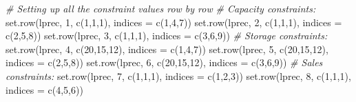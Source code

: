 \documentclass[
]{article}
\newenvironment{Shaded}{\begin{snugshade}}{\end{snugshade}}
\newcommand{\AttributeTok}[1]{\textcolor[rgb]{0.77,0.63,0.00}{#1}}
\newcommand{\CommentTok}[1]{\textcolor[rgb]{0.56,0.35,0.01}{\textit{#1}}}
\newcommand{\DecValTok}[1]{\textcolor[rgb]{0.00,0.00,0.81}{#1}}
\newcommand{\FunctionTok}[1]{\textcolor[rgb]{0.00,0.00,0.00}{#1}}
\newcommand{\NormalTok}[1]{#1}
\begin{document}
\begin{Shaded}
\begin{Highlighting}[]
\CommentTok{\# Setting up all the constraint values row by row}
\CommentTok{\# Capacity constraints:}
\FunctionTok{set.row}\NormalTok{(lprec, }\DecValTok{1}\NormalTok{, }\FunctionTok{c}\NormalTok{(}\DecValTok{1}\NormalTok{,}\DecValTok{1}\NormalTok{,}\DecValTok{1}\NormalTok{), }\AttributeTok{indices =} \FunctionTok{c}\NormalTok{(}\DecValTok{1}\NormalTok{,}\DecValTok{4}\NormalTok{,}\DecValTok{7}\NormalTok{))}
\FunctionTok{set.row}\NormalTok{(lprec, }\DecValTok{2}\NormalTok{, }\FunctionTok{c}\NormalTok{(}\DecValTok{1}\NormalTok{,}\DecValTok{1}\NormalTok{,}\DecValTok{1}\NormalTok{), }\AttributeTok{indices =} \FunctionTok{c}\NormalTok{(}\DecValTok{2}\NormalTok{,}\DecValTok{5}\NormalTok{,}\DecValTok{8}\NormalTok{))}
\FunctionTok{set.row}\NormalTok{(lprec, }\DecValTok{3}\NormalTok{, }\FunctionTok{c}\NormalTok{(}\DecValTok{1}\NormalTok{,}\DecValTok{1}\NormalTok{,}\DecValTok{1}\NormalTok{), }\AttributeTok{indices =} \FunctionTok{c}\NormalTok{(}\DecValTok{3}\NormalTok{,}\DecValTok{6}\NormalTok{,}\DecValTok{9}\NormalTok{))}
\CommentTok{\# Storage constraints:}
\FunctionTok{set.row}\NormalTok{(lprec, }\DecValTok{4}\NormalTok{, }\FunctionTok{c}\NormalTok{(}\DecValTok{20}\NormalTok{,}\DecValTok{15}\NormalTok{,}\DecValTok{12}\NormalTok{), }\AttributeTok{indices =} \FunctionTok{c}\NormalTok{(}\DecValTok{1}\NormalTok{,}\DecValTok{4}\NormalTok{,}\DecValTok{7}\NormalTok{))}
\FunctionTok{set.row}\NormalTok{(lprec, }\DecValTok{5}\NormalTok{, }\FunctionTok{c}\NormalTok{(}\DecValTok{20}\NormalTok{,}\DecValTok{15}\NormalTok{,}\DecValTok{12}\NormalTok{), }\AttributeTok{indices =} \FunctionTok{c}\NormalTok{(}\DecValTok{2}\NormalTok{,}\DecValTok{5}\NormalTok{,}\DecValTok{8}\NormalTok{))}
\FunctionTok{set.row}\NormalTok{(lprec, }\DecValTok{6}\NormalTok{, }\FunctionTok{c}\NormalTok{(}\DecValTok{20}\NormalTok{,}\DecValTok{15}\NormalTok{,}\DecValTok{12}\NormalTok{), }\AttributeTok{indices =} \FunctionTok{c}\NormalTok{(}\DecValTok{3}\NormalTok{,}\DecValTok{6}\NormalTok{,}\DecValTok{9}\NormalTok{))}
\CommentTok{\# Sales constraints:}
\FunctionTok{set.row}\NormalTok{(lprec, }\DecValTok{7}\NormalTok{, }\FunctionTok{c}\NormalTok{(}\DecValTok{1}\NormalTok{,}\DecValTok{1}\NormalTok{,}\DecValTok{1}\NormalTok{), }\AttributeTok{indices =} \FunctionTok{c}\NormalTok{(}\DecValTok{1}\NormalTok{,}\DecValTok{2}\NormalTok{,}\DecValTok{3}\NormalTok{))}
\FunctionTok{set.row}\NormalTok{(lprec, }\DecValTok{8}\NormalTok{, }\FunctionTok{c}\NormalTok{(}\DecValTok{1}\NormalTok{,}\DecValTok{1}\NormalTok{,}\DecValTok{1}\NormalTok{), }\AttributeTok{indices =} \FunctionTok{c}\NormalTok{(}\DecValTok{4}\NormalTok{,}\DecValTok{5}\NormalTok{,}\DecValTok{6}\NormalTok{))}

\end{Highlighting}
\end{Shaded}
\end{document}
